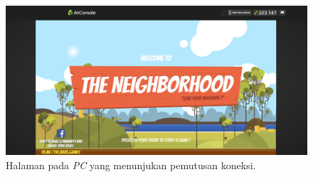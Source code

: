 \begin{figure}[H]
	\centering
	\includegraphics[scale=0.2]{Gambar/con9_play7}
	\caption{Halaman pada \textit{PC} yang menunjukan pemutusan koneksi.}
	\label{fig:29_con9_play7}
\end{figure}


